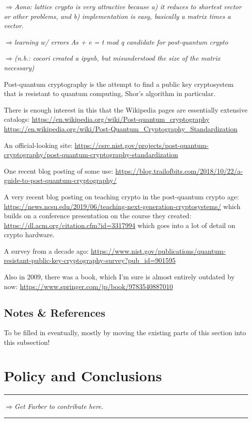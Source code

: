 \documentclass[%
 aip,
 jmp,%
 amsmath,amssymb,
 reprint,%
]{revtex4-1}
\def\outlinecomment#1{\hrule{\color{Blue}$\Rightarrow${\small\em #1}}\hrule}
\def\comment#1{{\color{ForestGreen}$\Rightarrow${\small\em #1}}}
\begin{document}
\comment{Aono: lattice crypto is very attractive because a) it reduces to
shortest vector or other problems, and b) implementation is easy,
basically a matrix times a vector.}

\comment{learning w/ errors As + e = t mod q
candidate for post-quantum crypto}

\comment{(n.b.: cocori created a ipynb, but misunderstood the size of the
matrix necessary)}


Post-quantum cryptography is the attempt to find a public key
cryptosystem that is resistant to quantum computing, Shor's algorithm
in particular.

There is enough interest in this that the Wikipedia pages are
essentially extensive catalogs:
\url{https://en.wikipedia.org/wiki/Post-quantum_cryptography}
\url{https://en.wikipedia.org/wiki/Post-Quantum_Cryptography_Standardization}

An official-looking site:
\url{https://csrc.nist.gov/projects/post-quantum-cryptography/post-quantum-cryptography-standardization}

One recent blog posting of some use:
\url{https://blog.trailofbits.com/2018/10/22/a-guide-to-post-quantum-cryptography/}

A very recent blog posting on teaching crypto in the post-quantum
crypto age:
\url{https://news.ncsu.edu/2019/06/teaching-next-generation-cryptosystems/}
which builds on a conference presentation on the course they created:
\url{https://dl.acm.org/citation.cfm?id=3317994}
which goes into a lot of detail on crypto hardware.

A survey from a decade ago:
\url{https://www.nist.gov/publications/quantum-resistant-public-key-cryptography-survey?pub_id=901595}

Also in 2009, there was a book, which I'm sure is almost entirely
outdated by now:
\url{https://www.springer.com/jp/book/9783540887010}

\subsection{Notes \& References}

To be filled in eventually, mostly by moving the existing parts of
this section into this subsection!

\section{Policy and Conclusions}

\outlinecomment{Get Farber to contribute here.}
\end{document}
